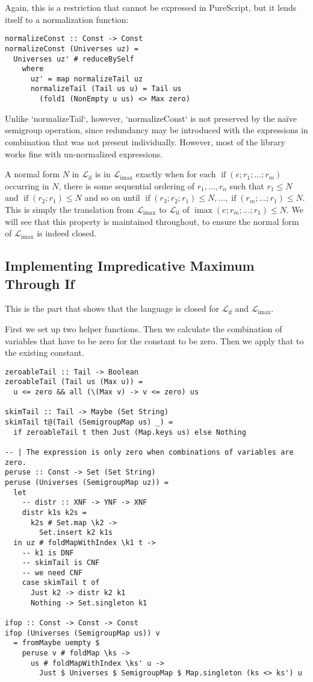 \documentclass[11pt, twoside, reqno]{book}
\DeclareMathOperator{\imax}{imax}
\DeclareMathOperator{\ifop}{if}
\begin{document}
Again, this is a restriction that cannot be expressed in PureScript, but it lends itself to a normalization function:
\begin{verbatim}
normalizeConst :: Const -> Const
normalizeConst (Universes uz) =
  Universes uz' # reduceBySelf
    where
      uz' = map normalizeTail uz
      normalizeTail (Tail us u) = Tail us
        (fold1 (NonEmpty u us) <> Max zero)
\end{verbatim}
Unlike \inHS`normalizeTail`, however, \inHS`normalizeConst` is not preserved by the na\"ive semigroup operation, since redundancy may be introduced with the expressions in combination that was not present individually.
However, most of the library works fine with un-normalized expressions.

A normal form $N$ in $\mathcal{L}_{\ifop}$ is in $\mathcal{L}_{\imax}$ exactly when for each $\ifop(e; r_1; \dots; r_m)$ occurring in $N$, there is some sequential ordering of $r_1, \dots, r_n$ such that $r_1 \le N$ and $\ifop(r_2; r_1) \le N$ and so on until $\ifop(r_3; r_2; r_1) \le N, \dots, \ifop(r_m; \dots; r_1) \le N$.
This is simply the translation from $\mathcal{L}_{\imax}$ to $\mathcal{L}_{\ifop}$ of $\imax(e; r_m; \dots; r_1) \le N$.
We will see that this property is maintained throughout, to ensure the normal form of $\mathcal{L}_{\imax}$ is indeed closed.

\subsection{Implementing Impredicative Maximum Through If}
This is the part that shows that the language is closed for $\mathcal{L}_{\ifop}$ and $\mathcal{L}_{\imax}$.

First we set up two helper functions.
Then we calculate the combination of variables that have to be zero for the constant to be zero.
Then we apply that to the existing constant.

\begin{verbatim}
zeroableTail :: Tail -> Boolean
zeroableTail (Tail us (Max u)) =
  u <= zero && all (\(Max v) -> v <= zero) us

skimTail :: Tail -> Maybe (Set String)
skimTail t@(Tail (SemigroupMap us) _) =
  if zeroableTail t then Just (Map.keys us) else Nothing

-- | The expression is only zero when combinations of variables are zero.
peruse :: Const -> Set (Set String)
peruse (Universes (SemigroupMap uz)) =
  let
    -- distr :: XNF -> YNF -> XNF
    distr k1s k2s =
      k2s # Set.map \k2 ->
        Set.insert k2 k1s
  in uz # foldMapWithIndex \k1 t ->
    -- k1 is DNF
    -- skimTail is CNF
    -- we need CNF
    case skimTail t of
      Just k2 -> distr k2 k1
      Nothing -> Set.singleton k1

ifop :: Const -> Const -> Const
ifop (Universes (SemigroupMap us)) v
  = fromMaybe uempty $
    peruse v # foldMap \ks ->
      us # foldMapWithIndex \ks' u ->
        Just $ Universes $ SemigroupMap $ Map.singleton (ks <> ks') u
\end{verbatim}
\end{document}
